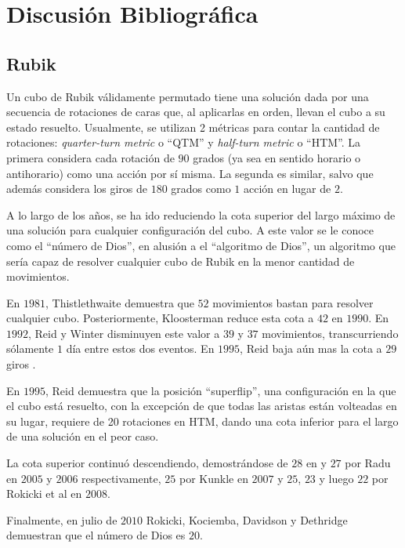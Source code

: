 \chapter{Discusión Bibliográfica}

\section*{Rubik}
Un cubo de Rubik válidamente permutado tiene una solución dada por una secuencia de rotaciones de caras que, al aplicarlas en orden, llevan el cubo a su estado resuelto. Usualmente, se utilizan 2 métricas para contar la cantidad de rotaciones: \emph{quarter-turn metric} o ``QTM'' y \emph{half-turn metric} o ``HTM''\cite{qtmhtm}. La primera considera cada rotación de $90$ grados (ya sea en sentido horario o antihorario) como una acción por sí misma. La segunda es similar, salvo que además considera los giros de $180$ grados como $1$ acción en lugar de $2$.

A lo largo de los años, se ha ido reduciendo la cota superior del largo máximo de una solución para cualquier configuración del cubo. A este valor se le conoce como el ``número de Dios'', en alusión a el ``algoritmo de Dios'', un algoritmo que sería capaz de resolver cualquier cubo de Rubik en la menor cantidad de movimientos.

En $1981$, Thistlethwaite\cite{thistlethwaite} demuestra que $52$ movimientos bastan para resolver cualquier cubo. Posteriormente, Kloosterman\cite{kloosterman} reduce esta cota a $42$ en $1990$. En $1992$, Reid y Winter disminuyen este valor a $39$ y $37$ movimientos, transcurriendo sólamente $1$ día entre estos dos eventos\cite{reid39}\cite{winter}. En $1995$, Reid baja aún mas la cota a $29$ giros \cite{reid29}.

En $1995$, Reid demuestra que la posición ``superflip'', una configuración en la que el cubo está resuelto, con la excepción de que todas las aristas están volteadas en su lugar, requiere de 20 rotaciones\cite{superflip} en HTM, dando una cota inferior para el largo de una solución en el peor caso.

La cota superior continuó descendiendo, demostrándose de $28$ en y $27$ por Radu\cite{radu28} en $2005$ y $2006$ respectivamente, $25$ por Kunkle\cite{kunkle} en $2007$ y $25$, $23$ y luego $22$ por Rokicki\cite{rokicki25}\cite{rokicki23}\cite{rokicki22} et al en $2008$.

Finalmente, en julio de $2010$ Rokicki, Kociemba, Davidson y Dethridge demuestran que el número de Dios es $20$\cite{godnumber20}.

